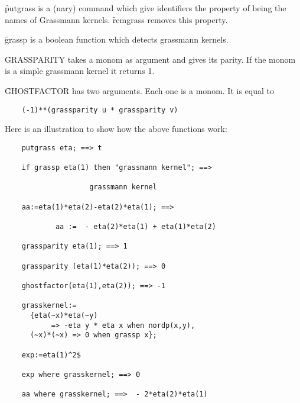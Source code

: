 \hypertarget{command:PUTGRASS}{}
\hypertarget{command:REMGRASS}{}
\f{putgrass} is a (nary) command which give identifiers the property
of being the names of Grassmann kernels. \f{remgrass} removes this property.

\hypertarget{operator:GRASSP}{}
\f{grassp} is a boolean function which detects grassmann kernels.

\hypertarget{operator:GRASSPARITY}{}
\f{GRASSPARITY} takes a monom as argument and gives its parity.
If the monom is a simple grassmann kernel it returns 1.

\hypertarget{operator:GHOSTFACTOR}{}
\f{GHOSTFACTOR} has two arguments. Each one is a monom. It is equal to
\begin{verbatim}
    (-1)**(grassparity u * grassparity v)
\end{verbatim}
Here is an illustration to show how the above functions work:
\begin{verbatim}
    putgrass eta; ==> t

    if grassp eta(1) then "grassmann kernel"; ==>

                    grassmann kernel

    aa:=eta(1)*eta(2)-eta(2)*eta(1); ==>

            aa :=  - eta(2)*eta(1) + eta(1)*eta(2)

    grassparity eta(1); ==> 1

    grassparity (eta(1)*eta(2)); ==> 0

    ghostfactor(eta(1),eta(2)); ==> -1

    grasskernel:=
      {eta(~x)*eta(~y) 
           => -eta y * eta x when nordp(x,y),
      (~x)*(~x) => 0 when grassp x};

    exp:=eta(1)^2$

    exp where grasskernel; ==> 0

    aa where grasskernel; ==>  - 2*eta(2)*eta(1)
\end{verbatim}
